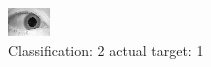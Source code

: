 \begin{figure}[h!]
\begin{center}
\includegraphics[width=0.60\columnwidth]{figures/ID1498_class_2_target_1.png}
\end{center}
\caption{ Classification: 2 actual target: 1}
\label{fig:ID1498_class_2_target_1}
\end{figure}
